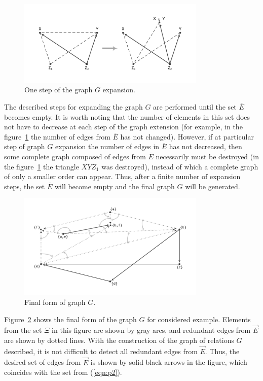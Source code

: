 \documentclass[
11pt,%
tightenlines,%
twoside,%
onecolumn,%
nofloats,%
nobibnotes,%
nofootinbib,%
superscriptaddress,%
noshowpacs,%
centertags]%
{revtex4}
\begin{document}
\begin{figure}[h]
\includegraphics[width=0.8\textwidth]{pics/step.pdf}
\caption{One step of the graph $G$ expansion.}
\label{fig:step}
\end{figure}

The described steps for expanding the graph $G$ are performed until the set $\overline{E}$ becomes empty.
It is worth noting that the number of elements in this set does not have to decrease at each step of the graph extension (for example, in the figure~\ref{fig:step} the number of edges from $\overline{E}$ has not changed).
However, if at particular step of graph $G$ expansion the number of edges in $\overline{E}$ has not decreased, then some complete graph composed of edges from $\overline{E}$ necessarily must be destroyed (in the figure~\ref{fig:step} the triangle $XYZ_1$ was destroyed), instead of which a complete graph of only a smaller order can appear.
Thus, after a finite number of expansion steps, the set $\overline{E}$ will become empty and the final graph $G$ will be generated.

\begin{figure}[h]
\includegraphics[width=0.8\textwidth]{pics/g.pdf}
\caption{Final form of graph $G$.}
\label{fig:g}
\end{figure}

Figure~\ref{fig:g} shows the final form of the graph $G$ for considered example.
Elements from the set $\Xi$ in this figure are shown by gray arcs, and redundant edges from $\overrightarrow{E}$ are shown by dotted lines.
With the construction of the graph of relations $G$ described, it is not difficult to detect all redundant edges from $\overrightarrow{E}$.
Thus, the desired set of edges from $\overrightarrow{E}$ is shown by solid black arrows in the figure, which coincides with the set from (\ref{eqn:p2}).
\end{document}
